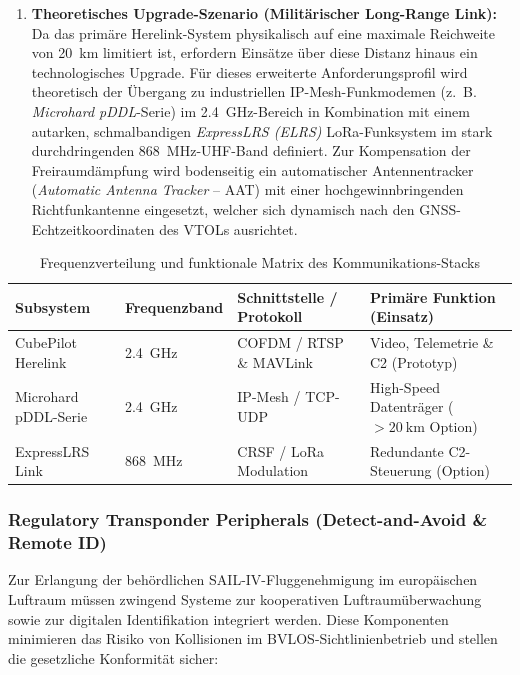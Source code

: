 \begin{enumerate}
    \item \textbf{Theoretisches Upgrade-Szenario (Militärischer Long-Range Link):} Da das primäre Herelink-System physikalisch auf eine maximale Reichweite von \SI{20}{\km} limitiert ist, erfordern Einsätze über diese Distanz hinaus ein technologisches Upgrade. 
    Für dieses erweiterte Anforderungsprofil wird theoretisch der Übergang zu industriellen IP-Mesh-Funkmodemen (z.~B. \textit{Microhard pDDL}-Serie) im \SI{2.4}{\GHz}-Bereich in Kombination mit einem autarken, schmalbandigen \textit{ExpressLRS (ELRS)} 
    LoRa-Funksystem im stark durchdringenden \SI{868}{\MHz}-UHF-Band definiert. Zur Kompensation der Freiraumdämpfung wird bodenseitig ein automatischer Antennentracker (\textit{Automatic Antenna Tracker} -- AAT) mit einer hochgewinnbringenden 
    Richtfunkantenne eingesetzt, welcher sich dynamisch nach den GNSS-Echtzeitkoordinaten des VTOLs ausrichtet.
\end{enumerate}

\begin{table}[h!]
    \centering
    \caption{Frequenzverteilung und funktionale Matrix des Kommunikations-Stacks}
    \vspace{0.2cm}
    \begin{tabular}{p{3.5cm} p{2.2cm} p{2.8cm} p{3.5cm}}
        \toprule
        \textbf{Subsystem} & \textbf{Frequenzband} & \textbf{Schnittstelle / Protokoll} & \textbf{Primäre Funktion (Einsatz)} \\
        \midrule
        CubePilot Herelink  & \SI{2.4}{\GHz} & COFDM / RTSP \& MAVLink & Video, Telemetrie \& C2 (Prototyp) \\
        Microhard pDDL-Serie & \SI{2.4}{\GHz} & IP-Mesh / TCP-UDP & High-Speed Datenträger ($>\SI{20}{\km}$ Option) \\
        ExpressLRS Link    & \SI{868}{\MHz} & CRSF / LoRa Modulation & Redundante C2-Steuerung (Option) \\
        \bottomrule
    \end{tabular}
    \label{tab:communication_matrix}
\end{table}

\newpage

\subsubsection{Regulatory Transponder Peripherals (Detect-and-Avoid \& Remote ID)}
\label{sec:regulatory_peripherals}

Zur Erlangung der behördlichen SAIL-IV-Fluggenehmigung im europäischen Luftraum müssen zwingend Systeme zur kooperativen Luftraumüberwachung sowie zur digitalen Identifikation integriert werden. Diese Komponenten minimieren das Risiko von 
Kollisionen im BVLOS-Sichtlinienbetrieb und stellen die gesetzliche Konformität sicher:

